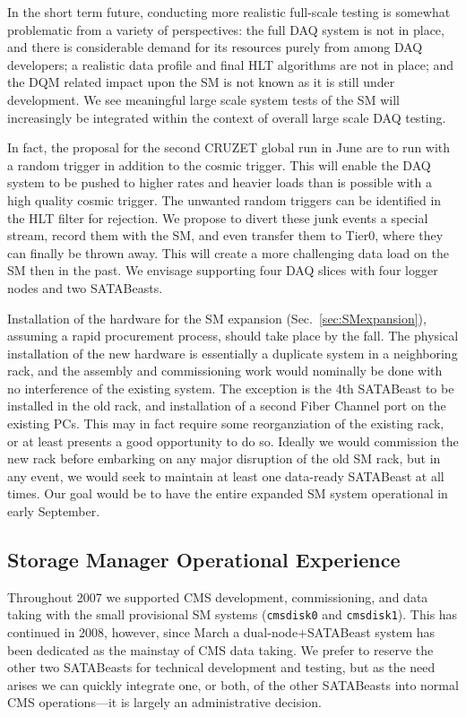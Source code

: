 In the short term future, conducting more realistic full-scale testing
is somewhat problematic from a variety of perspectives: 
the full DAQ system is not in place, 
and there is considerable demand for its resources purely from among DAQ developers;
a realistic data profile and final HLT algorithms are not in place;
and the DQM related impact upon the SM is not known as it is still under development.
We see meaningful large scale system tests of the SM will increasingly be integrated
within the context of overall large scale DAQ testing.
 

In fact, the proposal for the second  CRUZET global run in June are to run with a random trigger 
in addition to the cosmic trigger.
This will enable the DAQ system to be pushed to higher rates and heavier loads than
is possible with a high quality cosmic trigger. 
The unwanted random triggers can be identified in the  HLT filter for rejection.
We propose to divert these junk events a special stream, record them with the SM,
and even transfer them to Tier0, where they can finally be thrown away.
This will create a more challenging data load on the SM then in the past.
We envisage supporting four DAQ slices with four logger nodes and two SATABeasts.



Installation of the hardware for the SM expansion (Sec.~\ref{sec:SMexpansion}), 
assuming a rapid procurement process, should take place by the fall.
The physical installation of the new hardware is essentially a duplicate
system in a neighboring rack, and the assembly and commissioning work
would nominally be done with no interference of the existing system.
The exception is the 4th SATABeast to be installed in the old rack,
and installation of a second Fiber Channel port on the existing PCs.
This may in fact require some reorganziation of the existing rack, 
or at least presents a good opportunity to do so.
Ideally we would commission the new rack before embarking on any major
disruption of the old SM rack, but in any event, we would seek to maintain
at least one data-ready SATABeast at all times.
Our goal would be to have the entire expanded SM system operational
in early September.


\subsection{\label{sec:SMexperience} Storage Manager Operational Experience}

Throughout 2007 we supported CMS development, commissioning, and data taking
with the small provisional SM systems (\verb+cmsdisk0+ and \verb+cmsdisk1+).
This has continued in 2008, however,
since March a dual-node$+$SATABeast system has been dedicated
as the mainstay of CMS data taking.
We prefer to reserve the other two SATABeasts for technical development
and testing, but as the need arises we can quickly integrate one, or both,
of the other SATABeasts into normal CMS operations---it is largely an
administrative decision.

